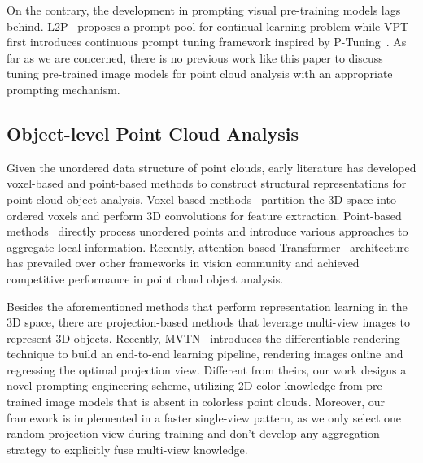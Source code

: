 \documentclass{article}
\begin{document}
On the contrary, the development in prompting visual pre-training models lags behind. L2P~\cite{wang2021l2p} proposes a prompt pool for continual learning problem while VPT~\cite{jia2022vpt} first introduces continuous prompt tuning framework inspired by P-Tuning~\cite{liu2021ptuning, liu2021ptuningv2}. As far as we are concerned, there is no previous work like this paper to discuss tuning pre-trained image models for point cloud analysis with an appropriate prompting mechanism.

\subsection{Object-level Point Cloud Analysis}

Given the unordered data structure of point clouds, early literature has developed voxel-based and point-based methods to construct structural representations for point cloud object analysis. Voxel-based methods~\cite{maturana2015voxnet, klokov2017kdnet, riegler2017octnet} partition the 3D space into ordered voxels and perform 3D convolutions for feature extraction. 
Point-based methods~\cite{qi2017pointnet, qi2017pointnet++, ma2022pointmlp, cheng2021pranet, li2018pointcnn, wu2019pointconv, thomas2019kpconv, wang2019dgcnn, li2018adagraph} directly process unordered points and introduce various approaches to aggregate local information. Recently, attention-based Transformer~\cite{vaswani201transformer,guo2021pct,zhao2021pointtransformer} architecture has prevailed over other frameworks in vision community and achieved competitive performance in point cloud object analysis. 

Besides the aforementioned methods that perform representation learning in the 3D space, there are projection-based methods\cite{su2015mvcnn,kanezaki2018rotationnet,wei2020viewgcn,hamdi2021mvtn,feng2018gvcnn, zhang2022pointclip} that leverage multi-view images to represent 3D objects. Recently, MVTN~\cite{hamdi2021mvtn} introduces the differentiable rendering technique to build an end-to-end learning pipeline, rendering images online and regressing the optimal projection view. Different from theirs, our work designs a novel prompting engineering scheme, utilizing 2D color knowledge from pre-trained image models that is absent in colorless point clouds. Moreover, our framework is implemented in a faster single-view pattern, as we only select one random projection view during training and don't develop any aggregation strategy to explicitly fuse multi-view knowledge.
\end{document}
